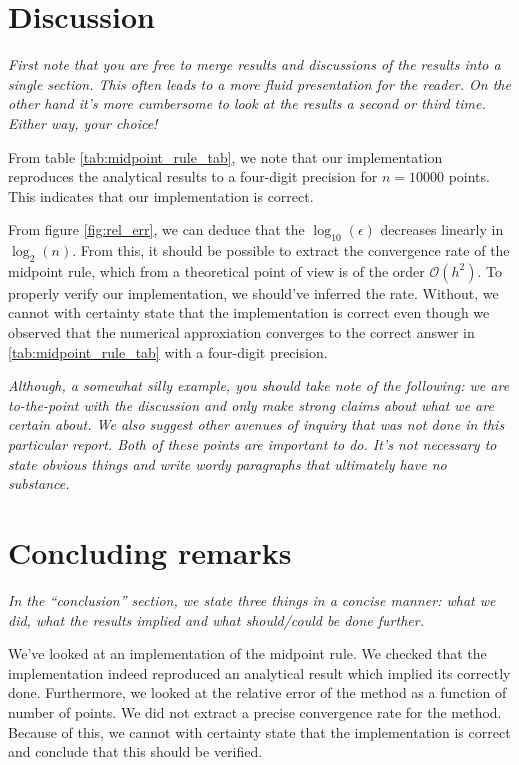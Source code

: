 \documentclass[english,notitlepage, reprint]{revtex4-1}  %
\begin{document}
\section{Discussion}\label{sec:discussion}
\textit{First note that you are free to merge results and discussions of the results into a single section. This often leads to a more fluid presentation for the reader. On the other hand it's more cumbersome to look at the results a second or third time. Either way, your choice!}

From table \ref{tab:midpoint_rule_tab}, we note that our implementation reproduces the analytical results to a four-digit precision for $n = 10000$ points. This indicates that our implementation is correct.

From figure \ref{fig:rel_err}, we can deduce that the $\log_{10}(\epsilon)$ decreases linearly in $\log_{2}(n)$. From this, it should be possible to extract the convergence rate of the midpoint rule, which from a theoretical point of view is of the order $\mathcal{O}(h^2)$. To properly verify our implementation, we should've inferred the rate. Without, we cannot with certainty state that the implementation is correct even though we observed that the numerical approxiation converges to the correct answer in \ref{tab:midpoint_rule_tab} with a four-digit precision.

\textit{Although, a somewhat silly example, you should take note of the following: we are to-the-point with the discussion and only make strong claims about what we are certain about. We also suggest other avenues of inquiry that was not done in this particular report. Both of these points are important to do. It's not necessary to state obvious things and write wordy paragraphs that ultimately have no substance.}

\section{Concluding remarks}\label{sec:conclusion}
\textit{In the ``conclusion'' section, we state three things in a concise manner: what we did, what the results implied and what should/could be done further.}

We've looked at an implementation of the midpoint rule. We checked that the implementation indeed reproduced an analytical result which implied its correctly done. Furthermore, we looked at the relative error of the method as a function of number of points. We did not extract a precise convergence rate for the method. Because of this, we cannot with certainty state that the implementation is correct and conclude that this should be verified.
\onecolumngrid
%

\end{document}
